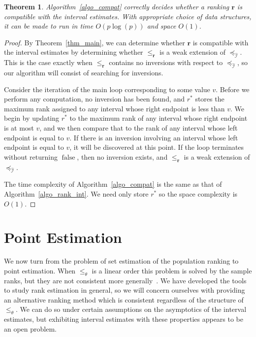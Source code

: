 \documentclass[12pt]{article}
\newcommand{\false}{\operatorname{false}}
\newcommand{\iord}{{\preceq_{\hat{\mathcal{I}}}}}
\newcommand{\pord}{{\leqslant_{\theta}}}
\newcommand{\rord}[1][\mathbf{r}]{{\leqslant_{#1}}}
\newtheorem{theorem}{Theorem}
\numberwithin{theorem}{section}
\begin{document}
\begin{theorem}
\label{thm_algo_compat}
Algorithm~\ref{algo_compat} correctly decides whether a ranking $\mathbf{r}$ is compatible with the interval estimates.  With appropriate choice of data structures, it can be made to run in time $O(p\log(p))$ and space $O(1)$.
\end{theorem}
\begin{proof}
By Theorem~\ref{thm_main}, we can determine whether $\mathbf{r}$ is compatible with the interval estimates by determining whether $\rord$ is a weak extension of $\iord$.  This is the case exactly when $\rord$ contains no inversions with respect to $\iord$, so our algorithm will consist of searching for inversions.

Consider the iteration of the main loop corresponding to some value $v$.  Before we perform any computation, no inversion has been found, and $r^*$ stores the maximum rank assigned to any interval whose right endpoint is less than $v$.  We begin by updating $r^*$ to the maximum rank of any interval whose right endpoint is at most $v$, and we then compare that to the rank of any interval whose left endpoint is equal to $v$.  If there is an inversion involving an interval whose left endpoint is equal to $v$, it will be discovered at this point.  If the loop terminates without returning $\false$, then no inversion exists, and $\rord$ is a weak extension of $\iord$.

The time complexity of Algorithm~\ref{algo_compat} is the same as that of Algorithm~\ref{algo_rank_int}.  We need only store $r^*$ so the space complexity is $O(1)$.
\end{proof}

\section{Point Estimation}
\label{sec_point_est}

We now turn from the problem of set estimation of the population ranking to point estimation.  When $\pord$ is a linear order this problem is solved by the sample ranks, but they are not consistent more generally~\citep{xie2009ties}.  We have developed the tools to study rank estimation in general, so we will concern ourselves with providing an alternative ranking method which is consistent regardless of the structure of $\pord$.  We can do so under certain assumptions on the asymptotics of the interval estimates, but exhibiting interval estimates with these properties appears to be an open problem.
\end{document}
